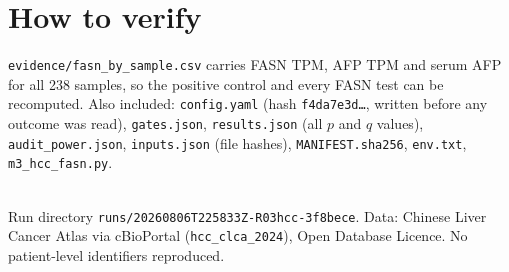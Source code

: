 \documentclass[11pt,a4paper]{article}
\begin{document}
\section{How to verify}

\texttt{evidence/fasn\_by\_sample.csv} carries FASN TPM, AFP TPM and serum AFP for all 238
samples, so the positive control and every FASN test can be recomputed. Also included:
\texttt{config.yaml} (hash \texttt{f4da7e3d\ldots}, written before any outcome was read),
\texttt{gates.json}, \texttt{results.json} (all $p$ and $q$ values),
\texttt{audit\_power.json}, \texttt{inputs.json} (file hashes),
\texttt{MANIFEST.sha256}, \texttt{env.txt}, \texttt{m3\_hcc\_fasn.py}.

\vfill
\noindent{\color{qgrey}\rule{\textwidth}{0.4pt}}\\
{\footnotesize\color{qgrey}Run directory \texttt{runs/20260806T225833Z-R03hcc-3f8bece}.
Data: Chinese Liver Cancer Atlas via cBioPortal (\texttt{hcc\_clca\_2024}), Open Database
Licence. No patient-level identifiers reproduced.}
\end{document}
